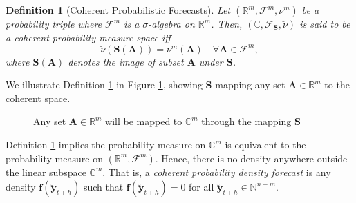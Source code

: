 \documentclass[a4paper, 11pt]{article}
\newtheorem{definition}{Definition}[section]
\begin{document}
\begin{definition}[Coherent Probabilistic Forecasts]\label{def:cohprob}
  Let $(\mathbb{R}^m, \bm{\mathscr{F}}^m, \nu^m)$ be a probability triple where $\mathscr{F}^m$ is a $\sigma$-algebra on $\mathbb{R}^m$. Then, $(\mathbb{C}, \mathscr{F}_{\bm{S}}, \breve{\nu})$ is said to be a coherent probability measure space iff
  $$
      \breve{\nu}(\bm{S}(\bm{A})) = \nu^m(\bm{A}) \quad \forall  \bm{A} \in \mathscr{F}^m,
    $$ 
  where $\bm{S}(\bm{A})$ denotes the image of subset $\bm{A}$ under $\bm{S}$. 
\end{definition}

We illustrate Definition \ref{def:cohprob} in Figure \ref{fig2}, showing $\bm{S}$ mapping any set $\bm{A}\in\mathbb{R}^m$ to the coherent space.

\begin{figure}[H]
  \begin{center}
    \newline
  \end{center}
  \caption{Any set $\bm{A} \in \mathbb{R}^m$ will be mapped to $\mathbb{C}^m$ through the mapping $\bm{S}$}\label{fig2}
\end{figure}

Definition \ref{def:cohprob} implies the probability measure on $\mathbb{C}^m$ is equivalent to the probability measure on $(\mathbb{R}^m, \bm{\mathscr{F}}^m)$. Hence, there is no density anywhere outside the linear subspace $\mathbb{C}^m$. That is, a \textit{coherent probability density forecast} is any density $\bm{f}(\breve{\bm{y}}_{t+h})$ such that $\bm{f}(\breve{\bm{y}}_{t+h})=0$ for all $\breve{\bm{y}}_{t+h} \in \bm{\mathbb{N}}^{n-m}$. 
\end{document}
